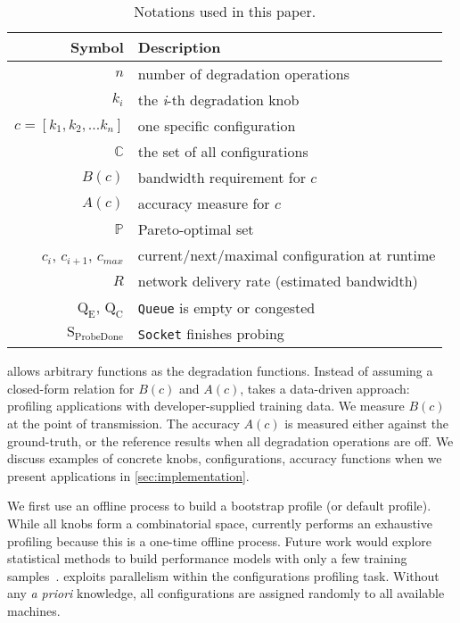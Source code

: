 \begin{table}
  \footnotesize
  \centering
  \begin{tabular}{r l}
    \toprule
    \textbf{Symbol} & \textbf{Description} \\
    \midrule
    $n$ & number of degradation operations \\
    $k_i$ & the \textit{i}-th degradation knob \\
    $c = [k_{1}, k_{2}, ... k_{n}]$ & one specific configuration \\
    $\mathbb{C}$ & the set of all configurations \\
    \midrule
    $B(c)$ & bandwidth requirement for $c$ \\
    $A(c)$ & accuracy measure for $c$ \\
    $\mathbb{P}$ & Pareto-optimal set \\
    \midrule
    $c_i$, $c_{i+1}$, $c_{max}$ & current/next/maximal configuration at runtime \\
    $R$ & network delivery rate (estimated bandwidth) \\
    $\text{Q}_\text{E}$, $\text{Q}_\text{C}$ & \texttt{Queue} is empty or congested \\
    $\text{S}_\text{ProbeDone}$ & \texttt{Socket} finishes probing \\
    \bottomrule
  \end{tabular}
  \caption{Notations used in this paper.}
  \label{tab:notations}
\end{table}

\sysname{} allows arbitrary functions as the degradation functions. Instead of
assuming a closed-form relation for $B(c)$ and $A(c)$, \sysname{} takes a
data-driven approach: profiling applications with developer-supplied training
data.  We measure $B(c)$ at the point of transmission. The accuracy $A(c)$ is
measured either against the ground-truth, or the reference results when all
degradation operations are off.  We discuss examples of concrete knobs,
configurations, accuracy functions when we present applications in
\autoref{sec:implementation}.

 We first use an offline process to build a bootstrap
profile (or default profile). While all knobs form a combinatorial space,
\sysname{} currently performs an exhaustive profiling because this is a one-time
offline process. Future work would explore statistical methods to build
performance models with only a few training
samples~\cite{venkataraman2016ernest}. \sysname{} exploits parallelism within
the configurations profiling task. Without any \textit{a priori} knowledge, all
configurations are assigned randomly to all available machines.

